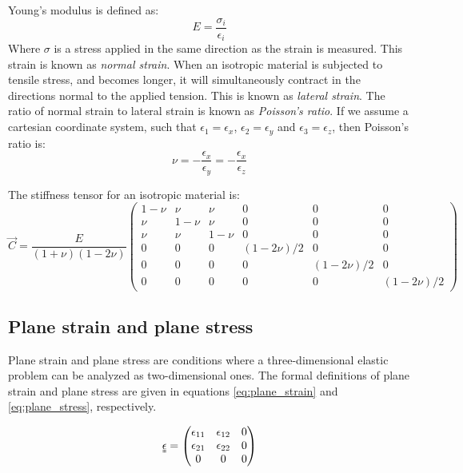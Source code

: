 Young's modulus is defined as:
\begin{equation}
	E = \frac{\sigma_{i}}{\epsilon_{i}}
\end{equation}
Where $\sigma$ is a stress applied in the same direction as the strain is measured. This strain is known as \emph{normal strain}. When an isotropic material is subjected to tensile stress, and becomes longer, it will simultaneously contract in the directions normal to the applied tension. This is known as \emph{lateral strain}. The ratio of normal strain to lateral strain is known as \emph{Poisson's ratio}. If we assume a cartesian coordinate system, such that $\epsilon_{1} = \epsilon_x$, $\epsilon_{2} = \epsilon_y$ and $\epsilon_{3} = \epsilon_z$, then Poisson's ratio is:
\begin{equation}
	\nu = -\frac{\epsilon_x}{\epsilon_y} = -\frac{\epsilon_x}{\epsilon_z}
\end{equation}

The stiffness tensor for an isotropic material is:
\begin{equation}
	\vec{C} = 
   	\frac{E}{(1+\nu)(1-2\nu)}
   	\begin{pmatrix}
		1-\nu & \nu & \nu & 0 & 0 & 0 \\
		\nu & 1-\nu & \nu & 0 & 0 & 0 \\
		   \nu & \nu & 1-\nu & 0 & 0 & 0 \\
		   0 & 0 & 0 & (1-2\nu)/2 & 0 & 0 \\
		   0 & 0 & 0 & 0 & (1-2\nu)/2 & 0 \\
		   0 & 0 & 0 & 0 & 0 & (1-2\nu)/2
	\end{pmatrix}
\end{equation}

\subsection{Plane strain and plane stress}
Plane strain and plane stress are conditions where a three-dimensional elastic problem can be analyzed as two-dimensional ones. The formal definitions of plane strain and plane stress are given in equations \ref{eq:plane_strain} and \ref{eq:plane_stress}, respectively.

\begin{equation}
\uuline \epsilon = 
\begin{pmatrix}
	\epsilon_{11} & \epsilon_{12} & 0 \\
	\epsilon_{21} & \epsilon_{22} & 0 \\
	0 & 0 & 0
\end{pmatrix}
\label{eq:plane_strain}
\end{equation}

